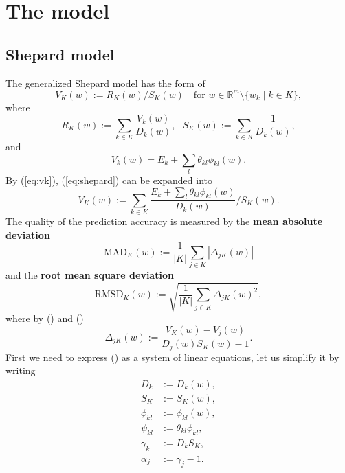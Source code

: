 \documentclass[12pt]{article}
\def\D{\displaystyle}
\begin{document}
\section{The model}
\label{sec:model}

\subsection{Shepard model}
\label{subsec:shepard}
The generalized Shepard model has the form of 
\begin{equation}
	\label{eq:shepard}
	V_K(w):=R_K(w)/S_K(w) ~~~ \text{ for } w \in \mathbb{R}^m \setminus \{w_k\mid k\in K \},
\end{equation}
where
\begin{equation}
	R_K(w):=\sum_{k\in K} \frac{V_k(w)}{D_k(w)},~~~
	S_K(w):=\sum_{k\in K} \frac{1}{D_k(w)},
\end{equation}
and
\begin{equation}
	\label{eq:vk}
	V_k(w) = E_k + \sum_l \theta_{kl} \phi_{kl}(w).
\end{equation}
By (\ref{eq:vk}), (\ref{eq:shepard}) can be expanded into
\begin{equation}
	\label{eq:vk_expand}
	V_K(w) := \sum_{k\in K} \frac{E_k + \sum_l \theta_{kl} \phi_{kl}(w)}{D_k(w)} / S_K(w). 
\end{equation}
The quality of the prediction accuracy is measured by the \textbf{mean absolute deviation}
\begin{equation}
	\text{MAD}_K(w) := \frac{1}{|K|}\sum_{j\in K}|\Delta_{jK}(w)|
\end{equation}
and the \textbf{root mean square deviation}
\begin{equation}
	\text{RMSD}_K(w) := \sqrt{\frac{1}{|K|}\sum_{j\in K}\Delta_{jK}(w)^2},
\end{equation}
where by () and ()
\begin{equation}
	\label{eq:delta}
	\Delta_{jK}(w):=\D\frac{V_K(w)-V_j(w)}{D_j(w)S_K(w)-1}.
\end{equation}
First we need to express () as a system of linear equations, let us simplify it by writing
\begin{equation*}
	\label{eq:simp}
	\begin{split}
		D_k &:= D_k(w), \\
		S_K &:= S_K(w), \\
		\phi_{kl} &:= \phi_{kl}(w),\\
		\psi_{kl} &:= \theta_{kl}\phi_{kl}, \\
		\gamma_k &:= D_kS_K, \\
		\alpha_j &:= \gamma_j-1.
	\end{split}
\end{equation*}
\end{document}
